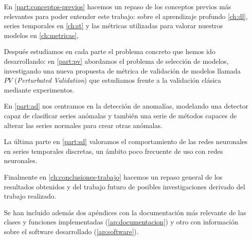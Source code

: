 En \autoref{part:conceptos-previos} hacemos un repaso de los conceptos previos más relevantes para poder entender este trabajo: sobre el aprendizaje profundo \autoref{ch:dl}, series temporales en \autoref{ch:st} y las métricas utilizadas para valorar nuestros modelos en \autoref{ch:metricas},

Después estudiamos en cada parte el problema concreto que hemos ido desarrollando: en \autoref{part:pv} abordamos el problema de selección de modelos, investigando una nueva propuesta de métrica de validación de modelos llamada $PV$ (\emph{Perturbated Validation}) que estudiamos frente a la validación clásica mediante experimentos.

En \autoref{part:ad} nos centramos en la detección de anomalías, modelando una detector capaz de clasificar series anómalas y también una serie de métodos capaces de alterar las series normales para crear otras anómalas.

La última parte en \autoref{part:sd} valoramos el comportamiento de las redes neuronales en series temporales discretas, un ámbito poco frecuente de uso con redes neuronales.

Finalmente en \autoref{ch:conclusiones-trabajo} hacemos un repaso general de los resultados obtenidos y del trabajo futuro de posibles investigaciones derivado del trabajo realizado.

Se han incluido además dos apéndices con la documentación más relevante de las clases y funciones implementadas (\autoref{ap:documentacion}) y otro con información sobre el software desarrollado (\autoref{ap:software}).

\endinput
